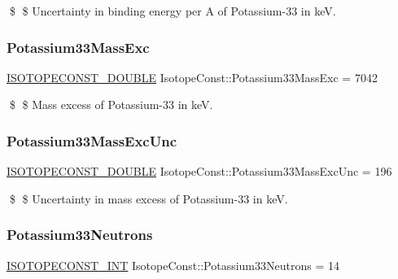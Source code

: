 \$ \$ Uncertainty in binding energy per A of Potassium-\/33 in keV. \mbox{\label{group___isotope_const-_potassium-_k33_gae986fddb59b0a3cd829b3553baf6752f}} 
\subsubsection{\texorpdfstring{Potassium33\+Mass\+Exc}{Potassium33MassExc}}
{\footnotesize\ttfamily \mbox{\hyperlink{group___isotope_const-_macros_ga8f45a7272ce02c0b4c65c44636ed719a}{I\+S\+O\+T\+O\+P\+E\+C\+O\+N\+S\+T\+\_\+\+D\+O\+U\+B\+LE}} Isotope\+Const\+::\+Potassium33\+Mass\+Exc = 7042}

\$ \$ Mass excess of Potassium-\/33 in keV. \mbox{\label{group___isotope_const-_potassium-_k33_gad827332aa09db0661439c123ecc197ab}} 
\subsubsection{\texorpdfstring{Potassium33\+Mass\+Exc\+Unc}{Potassium33MassExcUnc}}
{\footnotesize\ttfamily \mbox{\hyperlink{group___isotope_const-_macros_ga8f45a7272ce02c0b4c65c44636ed719a}{I\+S\+O\+T\+O\+P\+E\+C\+O\+N\+S\+T\+\_\+\+D\+O\+U\+B\+LE}} Isotope\+Const\+::\+Potassium33\+Mass\+Exc\+Unc = 196}

\$ \$ Uncertainty in mass excess of Potassium-\/33 in keV. \mbox{\label{group___isotope_const-_potassium-_k33_gab98459ea6faa8541f8be8dc4f3eb09ea}} 
\subsubsection{\texorpdfstring{Potassium33\+Neutrons}{Potassium33Neutrons}}
{\footnotesize\ttfamily \mbox{\hyperlink{group___isotope_const-_macros_ga5f18360b3e99483a35c32d789e62621c}{I\+S\+O\+T\+O\+P\+E\+C\+O\+N\+S\+T\+\_\+\+I\+NT}} Isotope\+Const\+::\+Potassium33\+Neutrons = 14}

